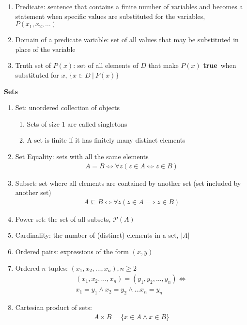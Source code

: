 \documentclass[landscape, a4paper]{article}
\let\geq\geqslant
\newcommand{\true}{\textbf{true}}
\renewcommand{\P}{\mathcal{P}}
\renewcommand{\and}{\wedge}
\newcommand{\heading}[1]{
    \noindent\textbf{#1}
}
\newenvironment{wenumerate}{\begin{enumerate}[wide, labelindent=2pt]}{\end{enumerate}}
\begin{document}
\begin{multicols*}{4}
\begin{wenumerate}
        \item Predicate: sentence that contains a finite number of variables and becomes a statement when specific values are substituted for the variables, $P(x_1, x_2, \ldots)$
        \item Domain of a predicate variable: set of all values that may be substituted in place of the variable
        \item Truth set of $P(x)$: set of all elements of $D$ that make $P(x)$ \true\ when substituted for $x$, $\{x \in D\ |\ P(x)\}$
    \end{wenumerate}
    \heading{Sets}
    \begin{wenumerate}
        \item Set: unordered collection of objects
        \begin{enumerate}
            \item Sets of size 1 are called singletons
            \item A set is finite if it has finitely many distinct elements
        \end{enumerate}
        \item Set Equality: sets with all the same elements
        \begin{align*}
            A=B \iff \forall z(z\in A\iff z \in B)
        \end{align*}
        \item Subset: set where all elements are contained by another set (set included by another set)
        \begin{align*}
            A\subseteq B \iff \forall z(z\in A\implies z\in B)
        \end{align*}
        \item Power set: the set of all subsets, $\P(A)$
        \item Cardinality: the number of (distinct) elements in a set, $|A|$
        \item Ordered pairs: expressions of the form $(x,y)$
        \item Ordered $n$-tuples: $(x_1, x_2, \ldots, x_n), n\geq 2$
        \begin{multline*}
            (x_1,x_2,\ldots, x_n)=(y_1,y_2,\ldots, y_n) \iff \\ x_1=y_1 \and x_2=y_2 \and \ldots x_n=y_n
        \end{multline*}
        \item Cartesian product of sets:
        \begin{align*}
            A\times B=\{x\in A \and x\in B\}

\end{align*}
\end{wenumerate}
\end{multicols*}
\end{document}
